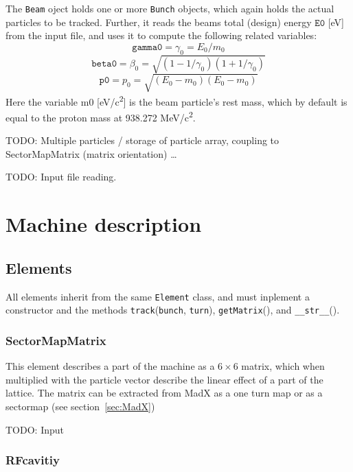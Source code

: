 \documentclass[a4paper]{report}
\begin{document}
The \texttt{Beam} oject holds one or more \texttt{Bunch} objects, which again holds the actual particles to be tracked. Further, it reads the beams total (design) energy $\mathtt{E0}$ [eV] from the input file, and uses it to compute the following related variables:
\begin{equation}
  \mathtt{gamma0} = \gamma_0 = E_0/m_0
\end{equation}
\begin{equation}
  \mathtt{beta0} = \beta_0 = \sqrt{\left(1-1/\gamma_0\right) \left(1+1/\gamma_0\right)}
\end{equation}
\begin{equation}
  \mathtt{p0} = p_0 = \sqrt{\left(E_0-m_0\right) \left(E_0-m_0\right)}
  \label{eq:designmomentum}
\end{equation}
Here the variable m0 [eV/c\textsuperscript{2}] is the beam particle's rest mass, which by default is equal to the proton mass at 938.272 MeV/c\textsuperscript{2}.

TODO: Multiple particles / storage of particle array, coupling to SectorMapMatrix (matrix orientation) \ldots

TODO: Input file reading.

\chapter{Machine description}
\label{sec:machine}



\section{Elements}
All elements inherit from the same \texttt{Element} class, and must inplement a constructor and the methods \texttt{track}(\texttt{bunch}, \texttt{turn}), \texttt{getMatrix}(), and \texttt{\_\_str\_\_}().

\subsection{SectorMapMatrix}
This element describes a part of the machine as a $6 \times 6$ matrix, which when multiplied with the particle vector describe the linear effect of a part of the lattice.
The matrix can be extracted from MadX as a one turn map or as a sectormap (see section~\ref{sec:MadX})

TODO: Input

\subsection{RFcavitiy}
\end{document}
